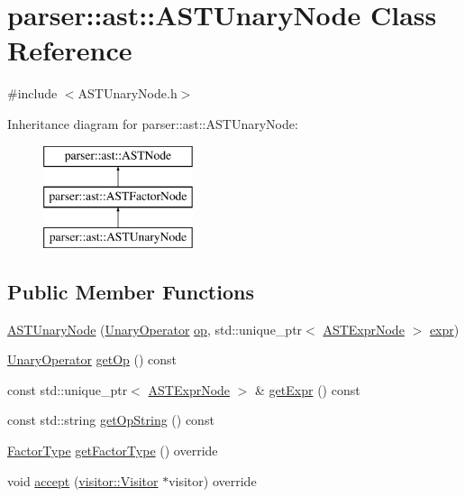 \hypertarget{classparser_1_1ast_1_1ASTUnaryNode}{}\section{parser\+:\+:ast\+:\+:A\+S\+T\+Unary\+Node Class Reference}
\label{classparser_1_1ast_1_1ASTUnaryNode}


{\ttfamily \#include $<$A\+S\+T\+Unary\+Node.\+h$>$}

Inheritance diagram for parser\+:\+:ast\+:\+:A\+S\+T\+Unary\+Node\+:\begin{figure}[H]
\begin{center}
\leavevmode
\includegraphics[height=3.000000cm]{d0/d6c/classparser_1_1ast_1_1ASTUnaryNode}
\end{center}
\end{figure}
\subsection*{Public Member Functions}
\begin{DoxyCompactItemize}
\item 
\hyperlink{classparser_1_1ast_1_1ASTUnaryNode_a13654e3c80e4e31f55ad21d6edd6ee29}{A\+S\+T\+Unary\+Node} (\hyperlink{ASTUnaryNode_8h_a3bd5cd6c8af529b35a5e745ad51d5cdf}{Unary\+Operator} \hyperlink{classparser_1_1ast_1_1ASTUnaryNode_a23a33ca1da4fb0fa2756e938e3aea686}{op}, std\+::unique\+\_\+ptr$<$ \hyperlink{classparser_1_1ast_1_1ASTExprNode}{A\+S\+T\+Expr\+Node} $>$ \hyperlink{classparser_1_1ast_1_1ASTUnaryNode_a9c40af1c793969cdefcdbadd953ad0ca}{expr})
\item 
\hyperlink{ASTUnaryNode_8h_a3bd5cd6c8af529b35a5e745ad51d5cdf}{Unary\+Operator} \hyperlink{classparser_1_1ast_1_1ASTUnaryNode_a162e6f618c42d077d526decfde550a48}{get\+Op} () const
\item 
const std\+::unique\+\_\+ptr$<$ \hyperlink{classparser_1_1ast_1_1ASTExprNode}{A\+S\+T\+Expr\+Node} $>$ \& \hyperlink{classparser_1_1ast_1_1ASTUnaryNode_a144541a1fef1be081ad57bfc0ce0039f}{get\+Expr} () const
\item 
const std\+::string \hyperlink{classparser_1_1ast_1_1ASTUnaryNode_ad4c36dae695c49e099bc5deed83ee7da}{get\+Op\+String} () const
\item 
\hyperlink{ASTFactorNode_8h_afbe2fcc03ef15b74a0c1ed1cda7ab0e8}{Factor\+Type} \hyperlink{classparser_1_1ast_1_1ASTUnaryNode_a1056ebc5c34b6f3b0a5485f4cd5ba3c0}{get\+Factor\+Type} () override
\item 
void \hyperlink{classparser_1_1ast_1_1ASTUnaryNode_a4b3bd9c26548e1fb73a82fd5b20add0b}{accept} (\hyperlink{classvisitor_1_1Visitor}{visitor\+::\+Visitor} $\ast$visitor) override
\end{DoxyCompactItemize}
